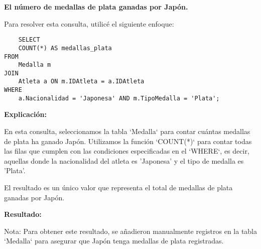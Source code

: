 \textbf{El número de medallas de plata ganadas por Japón.}\vspace{.3cm}

Para resolver esta consulta, utilicé el siguiente enfoque: \vspace{.3cm}

\begin{lstlisting}
    SELECT 
    COUNT(*) AS medallas_plata
FROM 
    Medalla m
JOIN 
    Atleta a ON m.IDAtleta = a.IDAtleta
WHERE 
    a.Nacionalidad = 'Japonesa' AND m.TipoMedalla = 'Plata';
\end{lstlisting}

\textbf{Explicación:} \vspace{.3cm}

En esta consulta, seleccionamos la tabla `Medalla` para contar cuántas medallas de plata ha ganado Japón. Utilizamos la función `COUNT(*)` para contar todas las filas que cumplen con las condiciones especificadas en el `WHERE`, es decir, aquellas donde la nacionalidad del atleta es 'Japonesa' y el tipo de medalla es 'Plata'. \vspace{.3cm}

El resultado es un único valor que representa el total de medallas de plata ganadas por Japón. \vspace{.3cm}

\textbf{Resultado:}
\begin{center}
    
\end{center}   

Nota: Para obtener este resultado, se añadieron manualmente registros en la tabla `Medalla` para asegurar que Japón tenga medallas de plata registradas. \vspace{.3cm}